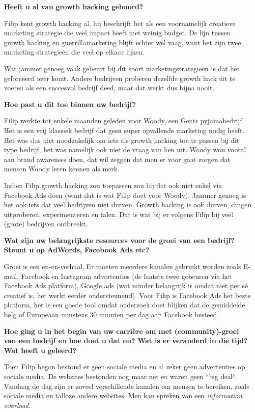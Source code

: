 \textbf{Heeft u al van growth hacking gehoord?}
	
Filip kent growth hacking al, hij beschrijft het als een voornamelijk creatieve marketing strategie die veel impact heeft met weinig budget. De lijn tussen growth hacking en guerrillamarketing blijft echter wel vaag, want het zijn twee marketing strategieën die veel op elkaar lijken. 

Wat jammer genoeg vaak gebeurt bij dit soort marketingstrategieën is dat het geforceerd over komt. Andere bedrijven proberen dezelfde growth hack uit te voeren als een succesvol bedrijf deed, maar dat werkt dus bijna nooit.

\textbf{Hoe past u dit toe binnen uw bedrijf?}
	
Filip werkte tot enkele maanden geleden voor Woody, een Gents pyjamabedrijf. Het is een vrij klassiek bedrijf dat geen super opvallende marketing nodig heeft. Het was dus niet noodzakelijk om iets als growth hacking toe te passen bij dit type bedrijf, het was namelijk ook niet de vraag van hen uit. Woody wou vooral aan brand awareness doen, dat wil zeggen dat men er voor gaat zorgen dat mensen Woody leren kennen als merk. 

Indien Filip growth hacking zou toepassen zou hij dat ook niet enkel via Facebook Ads doen (want dat is wat Filip doet voor Woody). Jammer genoeg is het ook iets dat veel bedrijven niet durven. Growth hacking is ook durven, dingen uitproberen, experimenteren en falen. Dat is wat bij er volgens Filip bij veel (grote) bedrijven ontbreekt.
	
\textbf{Wat zijn uw belangrijkste resources voor de groei van een bedrijf? Steunt u op AdWords, Facebook Ads etc?}
	
Groei is een en-en-verhaal. Er moeten meerdere kanalen gebruikt worden zoals E-mail, Facebook en Instagram advertenties (de laatste twee gebeuren via het Facebook Ads platform), Google ads (wat minder belangrijk is omdat niet per sé creatief is, het werkt eerder ondersteunend). Voor Filip is Facebook Ads het beste platform, het is een goede tool omdat onderzoek doet blijken dat de gemiddelde belg of Europeaan minstens 30 minuten per dag aan Facebook besteed.

\textbf{Hoe ging u in het begin van uw carrière om met (community)-groei van een bedrijf en hoe doet u dat nu? Wat is er veranderd in die tijd? Wat heeft u geleerd?}
	
Toen Filip begon bestond er geen sociale media en al zeker geen advertenties op sociale media. De websites bestonden nog maar net en waren geen ``big deal``. 
Vandaag de dag zijn er zoveel verschillende kanalen om mensen te bereiken, zoals sociale media en talloze andere websites. Men kan spreken van een \emph{information overload}. 

